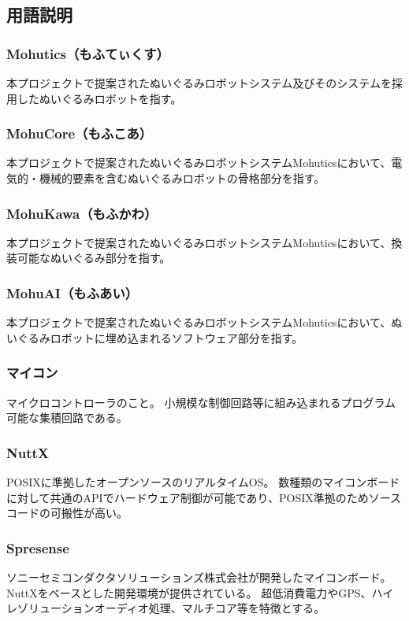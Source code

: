 \documentclass[uplatex,a4paper,12pt]{jsarticle}
\begin{document}
\subsection{用語説明}
\subsubsection*{Mohutics（もふてぃくす） \label{term:mohutics}}
本プロジェクトで提案されたぬいぐるみロボットシステム及びそのシステムを採用したぬいぐるみロボットを指す。

\subsubsection*{MohuCore（もふこあ）\label{term:mohucore}}
本プロジェクトで提案されたぬいぐるみロボットシステムMohuticsにおいて、電気的・機械的要素を含むぬいぐるみロボットの骨格部分を指す。

\subsubsection*{MohuKawa（もふかわ）\label{term:mohukawa}}
本プロジェクトで提案されたぬいぐるみロボットシステムMohuticsにおいて、換装可能なぬいぐるみ部分を指す。

\subsubsection*{MohuAI（もふあい）\label{term:mohuai}}
本プロジェクトで提案されたぬいぐるみロボットシステムMohuticsにおいて、ぬいぐるみロボットに埋め込まれるソフトウェア部分を指す。

\subsubsection*{マイコン}
マイクロコントローラのこと。
小規模な制御回路等に組み込まれるプログラム可能な集積回路である。

\subsubsection*{NuttX}
POSIXに準拠したオープンソースのリアルタイムOS。
数種類のマイコンボードに対して共通のAPIでハードウェア制御が可能であり、POSIX準拠のためソースコードの可搬性が高い。

\subsubsection*{Spresense}
ソニーセミコンダクタソリューションズ株式会社が開発したマイコンボード。
NuttXをベースとした開発環境が提供されている。
超低消費電力やGPS、ハイレゾリューションオーディオ処理、マルチコア等を特徴とする。
\end{document}
